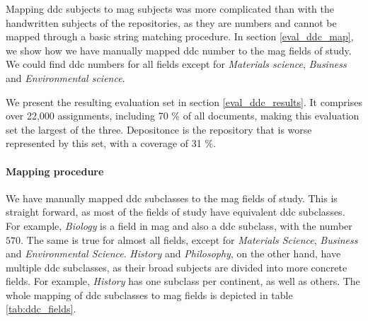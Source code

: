 Mapping \acrshort{ddc} subjects to \acrshort{mag} subjects was more complicated than with the handwritten subjects of the repositories, as they are numbers and cannot be mapped through a basic string matching procedure. In section \ref{eval_ddc_map}, we show how we have manually mapped \acrshort{ddc} number to the \acrshort{mag} fields of study. We could find \acrshort{ddc} numbers for all fields except for \textit{Materials science}, \textit{Business} and \textit{Environmental science}.

We present the resulting evaluation set in section \ref{eval_ddc_results}. It comprises over 22,000 assignments, including 70 \% of all documents, making this evaluation set the largest of the three. Depositonce is the repository that is worse represented by this set, with a coverage of 31 \%.

\paragraph{Mapping procedure} \mbox{} \label{eval_ddc_map}

We have manually mapped \acrshort{ddc} subclasses to the \acrshort{mag} fields of study. This is straight forward, as most of the fields of study have equivalent \acrshort{ddc} subclasses. For example, \textit{Biology} is a field in \acrshort{mag} and also a \acrshort{ddc} subclass, with the number $570$. The same is true for almost all fields, except for \textit{Materials Science}, \textit{Business} and \textit{Environmental Science}. \textit{History} and \textit{Philosophy}, on the other hand, have multiple \acrshort{ddc} subclasses, as their broad subjects are divided into more concrete fields. For example, \textit{History} has one subclass per continent, as well as others. The whole mapping of \acrshort{ddc} subclasses to \acrshort{mag} fields is depicted in table \ref{tab:ddc_fields}.

